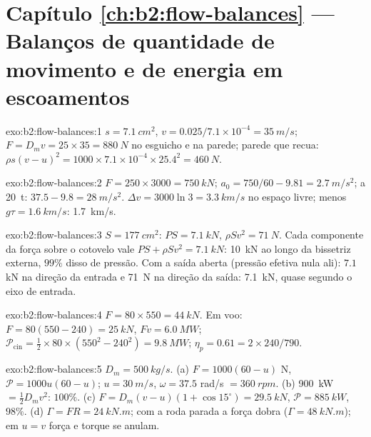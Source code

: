 \section*{Capítulo \ref{ch:b2:flow-balances} --- Balanços de quantidade de movimento e de energia em escoamentos}

\begin{solution}{exo:b2:flow-balances:1}
$s = \qty{7.1}{cm^2}$, $v = 0.025/7.1 \times 10^{-4} = \qty{35}{m/s}$; $F = D_mv = 25
\times 35 = \qty{880}{N}$ no esguicho e na parede; parede que recua: $\rho s(v -
u)^2 = 1000 \times 7.1 \times 10^{-4} \times 25.4^2 = \qty{460}{N}$.
\end{solution}

\begin{solution}{exo:b2:flow-balances:2}
$F = 250 \times 3000 = \qty{750}{kN}$; $a_0 = 750/60 - 9.81 = \qty{2.7}{m/s^2}$; a
\qty{20}{t}: $37.5 - 9.8 = \qty{28}{m/s^2}$. $\Delta v = 3000\ln3 = \qty{3.3}{km/s}$ no
espaço livre; menos $g\tau = \qty{1.6}{km/s}$: \qty{1.7}{km/s}.
\end{solution}

\begin{solution}{exo:b2:flow-balances:3}
$S = \qty{177}{cm^2}$: $PS = \qty{7.1}{kN}$, $\rho Sv^2 = \qty{71}{N}$. Cada componente
da força sobre o cotovelo vale $PS + \rho Sv^2 = \qty{7.1}{kN}$: \qty{10}{kN} ao longo
da bissetriz externa, $99\%$ disso de pressão. Com a saída aberta (pressão efetiva
nula ali): $7.1$ kN na direção da entrada e \qty{71}{N} na direção da
saída: \qty{7.1}{kN}, quase segundo o eixo de entrada.
\end{solution}

\begin{solution}{exo:b2:flow-balances:4}
$F = 80 \times 550 = \qty{44}{kN}$. Em voo: $F = 80(550 - 240) = \qty{25}{kN}$, $Fv =
\qty{6.0}{MW}$; $\mathcal P_{\text{cin}} = \tfrac12 \times 80 \times (550^2 - 240^2) =
\qty{9.8}{MW}$; $\eta_p = 0.61 = 2 \times 240/790$.
\end{solution}

\begin{solution}{exo:b2:flow-balances:5}
$D_m = \qty{500}{kg/s}$. (a) $F = 1000(60 - u)$ N, $\mathcal P = 1000u(60 - u)$; $u =
\qty{30}{m/s}$, $\omega = 37.5$ rad/s $= \qty{360}{rpm}$. (b) \qty{900}{kW} $=
\tfrac12D_mv^2$: $100\%$. (c) $F = D_m(v - u)(1 + \cos15^\circ) = \qty{29.5}{kN}$, $\mathcal P
= \qty{885}{kW}$, $98\%$. (d) $\Gamma = FR = \qty{24}{kN.m}$; com a roda parada a força
dobra ($\Gamma = \qty{48}{kN.m}$); em $u = v$ força e torque se anulam.
\end{solution}

